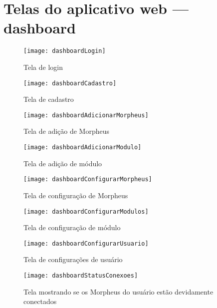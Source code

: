 \chapter{Telas do aplicativo web --- dashboard}
\label{attachmentsDashboardTelas}

\begin{figure}[H]
	\centering
	\caption{Tela de login}
	\texttt{[image: dashboardLogin]}
	\label{fig:dashboardLogin}
\end{figure}

\begin{figure}[H]
	\centering
	\caption{Tela de cadastro}
	\texttt{[image: dashboardCadastro]}
	\label{fig:dashboardCadastro}
\end{figure}

\begin{figure}[H]
	\centering
	\caption{Tela de adição de Morpheus}
	\texttt{[image: dashboardAdicionarMorpheus]}
	\label{fig:dashboardAdicionarMorpheus}
\end{figure}

\begin{figure}[H]
	\centering
	\caption{Tela de adição de módulo}
	\texttt{[image: dashboardAdicionarModulo]}
	\label{fig:dashboardAdicionarModulo}
\end{figure}

\begin{figure}[H]
	\centering
	\caption{Tela de configuração de Morpheus}
	\texttt{[image: dashboardConfigurarMorpheus]}
	\label{fig:dashboardConfigurarMorpheus}
\end{figure}

\begin{figure}[H]
	\centering
	\caption{Tela de configuração de módulo}
	\texttt{[image: dashboardConfigurarModulos]}
	\label{fig:dashboardConfigurarModulos}
\end{figure}

\begin{figure}[H]
	\centering
	\caption{Tela de configurações de usuário}
	\texttt{[image: dashboardConfigurarUsuario]}
	\label{fig:dashboardConfigurarUsuario}
\end{figure}

\begin{figure}[H]
	\centering
	\caption{Tela mostrando se os Morpheus do usuário estão devidamente conectados}
	\texttt{[image: dashboardStatusConexoes]}
	\label{fig:dashboardStatusConexoes}
\end{figure}

